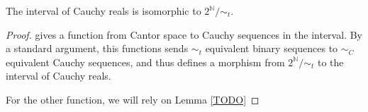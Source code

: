 \begin{theorem}
  The interval of Cauchy reals is isomorphic to $2^\mathbb N / \sim_t$. 
\end{theorem} 
\begin{proof}
   gives a function from Cantor space to Cauchy sequences in the interval. 
  By a standard argument, this functions sends $\sim_t$ equivalent binary sequences to $\sim_C$ equivalent 
  Cauchy sequences, and thus defines a morphism from $2^\mathbb N/\sim_t$ to the interval of Cauchy reals. 

  For the other function, we will rely on Lemma \cref{TODO}
\end{proof}

